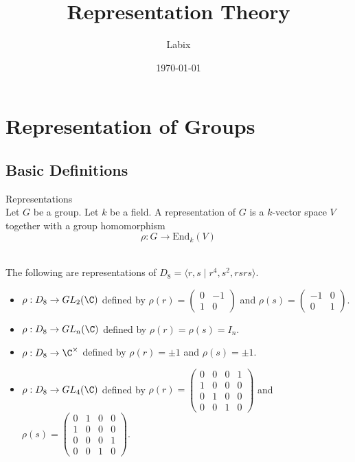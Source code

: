 \documentclass[a4paper]{article}
\title{Representation Theory}
\author{Labix}
\date{\today}
\begin{document}
\maketitle
\begin{abstract}
\end{abstract}
\pagebreak
\tableofcontents
\pagebreak
\section{Representation of Groups}
\subsection{Basic Definitions}
\begin{defn}{Representations}{}\\
Let $G$ be a group. Let $k$ be a field. A representation of $G$ is a $k$-vector space $V$ together with a group homomorphism $$\rho:G\to\text{End}_k(V)$$
\end{defn}

\begin{eg}{}{}\\
The following are representations of $D_8=\langle r,s\;|\;r^4,s^2,rsrs\rangle$. 
\begin{itemize}
\item $\rho:D_8\to GL_2(\C)$ defined by $\rho(r)=\begin{pmatrix}
0 & -1\\
1 & 0
\end{pmatrix}$ and $\rho(s)=\begin{pmatrix}
-1 & 0\\
0 & 1
\end{pmatrix}$. 
\item $\rho:D_8\to GL_n(\C)$ defined by $\rho(r)=\rho(s)=I_n$. 
\item $\rho:D_8\to\C^\times$ defined by $\rho(r)=\pm1$ and $\rho(s)=\pm1$. 
\item $\rho:D_8\to GL_4(\C)$ defined by $\rho(r)=\begin{pmatrix}
0 & 0 & 0 & 1\\
1 & 0 & 0 & 0\\
0 & 1 & 0 & 0\\
0 & 0 & 1 & 0
\end{pmatrix}$ and $\rho(s)=\begin{pmatrix}
0 & 1 & 0 & 0\\
1 & 0 & 0 & 0\\
0 & 0 & 0 & 1\\
0 & 0 & 1 & 0
\end{pmatrix}$. 
\end{itemize}
\end{eg}
\end{document}
